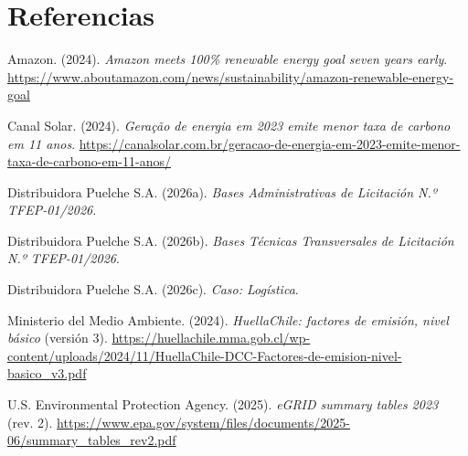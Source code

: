 \documentclass[oficio,firma,final]{lafrox}
\begin{document}
\section*{Referencias}

{\setlength{\parindent}{0pt}\expandafter\def\expandafter\UrlBreaks\expandafter{\UrlBreaks\do\-}%
\hangindent=1.27cm Amazon. (2024). \textit{Amazon meets 100\% renewable energy goal seven years early}. \url{https://www.aboutamazon.com/news/sustainability/amazon-renewable-energy-goal}\par\medskip
\hangindent=1.27cm Canal Solar. (2024). \textit{Geração de energia em 2023 emite menor taxa de carbono em 11 anos}. \url{https://canalsolar.com.br/geracao-de-energia-em-2023-emite-menor-taxa-de-carbono-em-11-anos/}\par\medskip
\hangindent=1.27cm Distribuidora Puelche S.A. (2026a). \textit{Bases Administrativas de Licitación N.º TFEP-01/2026}.\par\medskip
\hangindent=1.27cm Distribuidora Puelche S.A. (2026b). \textit{Bases Técnicas Transversales de Licitación N.º TFEP-01/2026}.\par\medskip
\hangindent=1.27cm Distribuidora Puelche S.A. (2026c). \textit{Caso: Logística}.\par\medskip
\hangindent=1.27cm Ministerio del Medio Ambiente. (2024). \textit{HuellaChile: factores de emisión, nivel básico} (versión 3). \url{https://huellachile.mma.gob.cl/wp-content/uploads/2024/11/HuellaChile-DCC-Factores-de-emision-nivel-basico_v3.pdf}\par\medskip
\hangindent=1.27cm U.S. Environmental Protection Agency. (2025). \textit{eGRID summary tables 2023} (rev. 2). \url{https://www.epa.gov/system/files/documents/2025-06/summary_tables_rev2.pdf}\par\medskip
}
\end{document}
